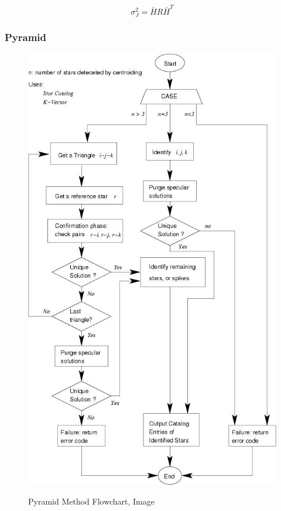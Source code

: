\documentclass[12pt,a4paper,oneside]{article}
\begin{document}
\begin{equation}
\sigma_J^2 = \bar{H}R\bar{H}^T
\end{equation}

\subsubsection{Pyramid}

\begin{figure}
\includegraphics[scale=0.57]{pyramid_method.jpg}
\centering
\label{fig:pyramid_method}
\caption{Pyramid Method Flowchart, Image \cite{mortari2004pyramid}}
\end{figure}
\end{document}
